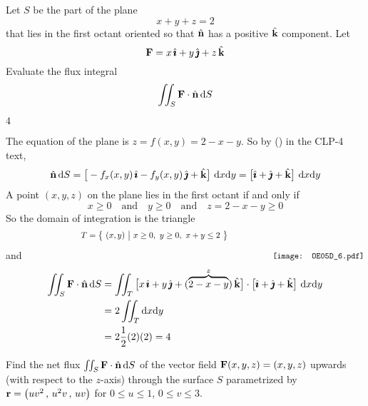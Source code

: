 \begin{question}[M317 2005D] %
Let $S$ be the part of the plane
\begin{equation*}
x + y + z =2
\end{equation*}
that lies in the first octant oriented so that $\hat{\mathbf{n}}$ has a positive 
$\hat{\mathbf{k}}$ component. Let
\begin{equation*}
\mathbf{F} = x\,\hat{\pmb{\imath}} + y\,\hat{\pmb{\jmath}} + z\,\hat{\mathbf{k}}
\end{equation*}
Evaluate the flux integral
\begin{equation*}
\iint_S \mathbf{F}\cdot\hat{\mathbf{n}}\, \mathrm{d}S
\end{equation*}
\end{question}

%

\begin{answer} 
$4$
\end{answer}

\begin{solution}
The equation of the plane is $z=f(x,y) = 2-x-y$. So by
() in the CLP-4 text,
\begin{equation*}
\hat{\mathbf{n}}\,\mathrm{d}S = \big[-f_x(x,y)\,\hat{\pmb{\imath}} - f_y(x,y)\,\hat{\pmb{\jmath}} + \hat{\mathbf{k}}\big]\ \mathrm{d}x\mathrm{d}y
             = \big[\hat{\pmb{\imath}} + \hat{\pmb{\jmath}} + \hat{\mathbf{k}}\big]\ \mathrm{d}x\mathrm{d}y
\end{equation*}
A point $(x,y,z)$ on the plane lies in the first octant if and only if
\begin{equation*}
x\ge 0\quad\text{and}\quad
y\ge 0\quad\text{and}\quad
z=2-x-y\ge 0
\end{equation*}
So the domain of integration is the triangle
\begin{equation*}
\hskip1.25in T = \Set{(x,y)}{x\ge 0,\ y\ge 0,\ x+y\le 2} \hskip0.75in
\raisebox{-25pt}[0pt][5pt]{\texttt{[image: OE05D\_6.pdf]}}
\end{equation*}
and
\begin{align*}
\iint_S \mathbf{F}\cdot\hat{\mathbf{n}}\, \mathrm{d}S
&=\iint_T \big[x\,\hat{\pmb{\imath}}+y\,\hat{\pmb{\jmath}} +(\overbrace{2-x-y}^{z})\,\hat{\mathbf{k}}\big]
         \cdot\big[\hat{\pmb{\imath}} + \hat{\pmb{\jmath}} + \hat{\mathbf{k}}\big]\ \mathrm{d}x\mathrm{d}y \\
& = 2 \iint_T \mathrm{d}x\mathrm{d}y \\
& = 2 \frac{1}{2}(2)(2) = 4
\end{align*}

\end{solution}

\begin{question}[M317 2005A] %
Find the net flux $\iint_S \mathbf{F}\cdot\hat{\mathbf{n}}\,\mathrm{d}S$ of the vector field
$\mathbf{F}(x,y,z) = (x,y,z)$ upwards (with respect to the $z$-axis) through
the surface $S$ parametrized by $\mathbf{r} = \big(uv^2\,,\,u^2v\,,\,uv\big)$
for $0\le u\le 1$, $0\le v\le 3$.
\end{question}


